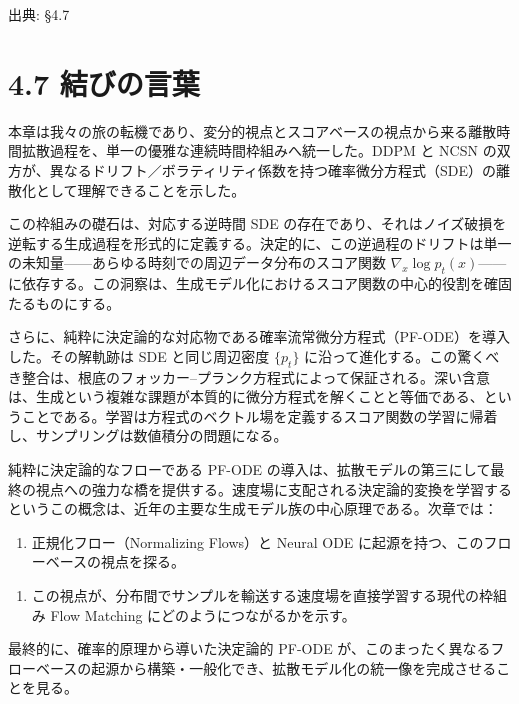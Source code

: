 

{\color{gray}\footnotesize 出典: §4.7\par}
\vspace{0.2em}
\section*{4.7 結びの言葉}



本章は我々の旅の転機であり、変分的視点とスコアベースの視点から来る離散時間拡散過程を、単一の優雅な連続時間枠組みへ統一した。DDPM と NCSN の双方が、異なるドリフト／ボラティリティ係数を持つ確率微分方程式（SDE）の離散化として理解できることを示した。

この枠組みの礎石は、対応する逆時間 SDE の存在であり、それはノイズ破損を逆転する生成過程を形式的に定義する。決定的に、この逆過程のドリフトは単一の未知量——あらゆる時刻での周辺データ分布のスコア関数 $\nabla_x\log p_t(x)$——に依存する。この洞察は、生成モデル化におけるスコア関数の中心的役割を確固たるものにする。

さらに、純粋に決定論的な対応物である確率流常微分方程式（PF-ODE）を導入した。その解軌跡は SDE と同じ周辺密度 $\{p_t\}$ に沿って進化する。この驚くべき整合は、根底のフォッカー–プランク方程式によって保証される。深い含意は、生成という複雑な課題が本質的に微分方程式を解くことと等価である、ということである。学習は方程式のベクトル場を定義するスコア関数の学習に帰着し、サンプリングは数値積分の問題になる。

純粋に決定論的なフローである PF-ODE の導入は、拡散モデルの第三にして最終の視点への強力な橋を提供する。速度場に支配される決定論的変換を学習するというこの概念は、近年の主要な生成モデル族の中心原理である。次章では：

\begin{enumerate}
\item 正規化フロー（Normalizing Flows）と Neural ODE に起源を持つ、このフローベースの視点を探る。
\end{enumerate}


\begin{enumerate}
\item この視点が、分布間でサンプルを輸送する速度場を直接学習する現代の枠組み Flow Matching にどのようにつながるかを示す。
\end{enumerate}


最終的に、確率的原理から導いた決定論的 PF-ODE が、このまったく異なるフローベースの起源から構築・一般化でき、拡散モデル化の統一像を完成させることを見る。

